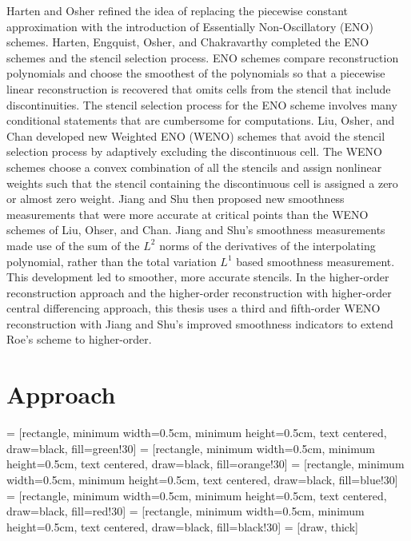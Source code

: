 Harten and Osher \cite{HARTENOSHER1987279} refined the idea of replacing the piecewise constant approximation with the introduction of Essentially Non-Oscillatory (ENO) schemes. Harten, Engquist, Osher, and Chakravarthy \cite{HARTEN19973} completed the ENO schemes and the stencil selection process. ENO schemes compare reconstruction polynomials and choose the smoothest of the polynomials so that a piecewise linear reconstruction is recovered that omits cells from the stencil that include discontinuities. The stencil selection process for the ENO scheme involves many conditional statements that are cumbersome for computations. Liu, Osher, and Chan \cite{LIU1994200} developed new Weighted ENO (WENO) schemes that avoid the stencil selection process by adaptively excluding the discontinuous cell. The WENO schemes choose a convex combination of all the stencils and assign nonlinear weights such that the stencil containing the discontinuous cell is assigned a zero or almost zero weight. Jiang and Shu \cite{1996JCoPh.126..202J} then proposed new smoothness measurements that were more accurate at critical points than the WENO schemes of Liu, Ohser, and Chan. Jiang and Shu's smoothness measurements made use of the sum of the $L^2$ norms of the derivatives of the interpolating polynomial, rather than the total variation $L^1$ based smoothness measurement. This development led to smoother, more accurate stencils. In the higher-order reconstruction approach and the higher-order reconstruction with higher-order central differencing approach, this thesis uses a third and fifth-order WENO reconstruction with Jiang and Shu's improved smoothness indicators to extend Roe's scheme to higher-order.

\section{Approach}


 = [rectangle, minimum width=0.5cm, minimum height=0.5cm, text centered, draw=black, fill=green!30]
 = [rectangle, minimum width=0.5cm, minimum height=0.5cm, text centered, draw=black, fill=orange!30]
 = [rectangle, minimum width=0.5cm, minimum height=0.5cm, text centered, draw=black, fill=blue!30]
 = [rectangle, minimum width=0.5cm, minimum height=0.5cm, text centered, draw=black, fill=red!30]
 = [rectangle, minimum width=0.5cm, minimum height=0.5cm, text centered, draw=black, fill=black!30]
 = [draw, thick]

